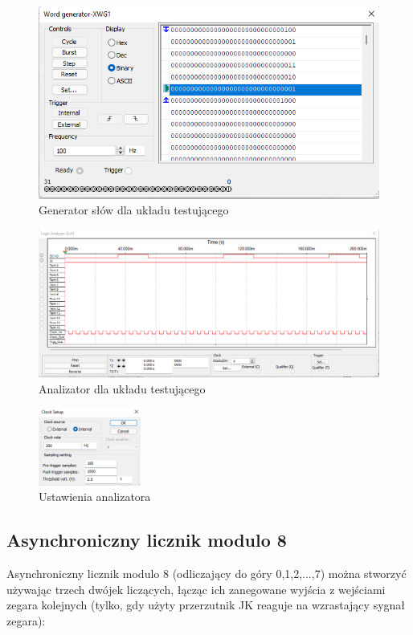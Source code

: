 \documentclass{article}
\begin{document}
\begin{figure}[H]
    \centering
    \includegraphics[width=\textwidth]{3a_dwojka_gen.png}
    \caption{Generator słów dla układu testującego}
\end{figure}

\begin{figure}[H]
    \centering
    \includegraphics[width=\textwidth]{3a_dwojka_ana.png}
    \caption{Analizator dla układu testującego}
\end{figure}

\begin{figure}[H]
    \centering
    \includegraphics[width=0.3\textwidth]{3a_dwojka_anasetup.png}
    \caption{Ustawienia analizatora}
\end{figure}

\subsection{Asynchroniczny licznik modulo 8}
Asynchroniczny licznik modulo 8 (odliczający do góry 0,1,2,...,7) można stworzyć używając trzech dwójek liczących, łącząc ich zanegowane wyjścia z wejściami
zegara kolejnych (tylko, gdy użyty przerzutnik JK reaguje na wzrastający sygnał zegara):
\end{document}
